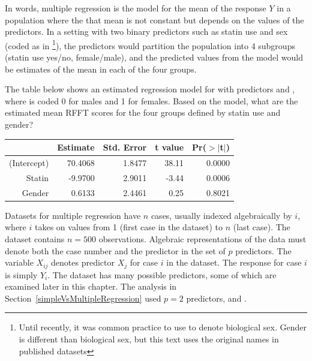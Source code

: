 In words, multiple regression is the model for the mean of the response $Y$ in a population where the that mean is not constant but depends on the values of the predictors.  In a setting with two binary predictors such as statin use and sex (coded as  in \footnote{Until recently, it was common practice to use  to denote biological sex. Gender is different than biological sex, but this text uses the original names in published datasets}), the predictors would partition the population into 4 subgroups (statin use yes/no, female/male), and the predicted values from the model would be estimates of the mean in each of the four groups.

\begin{exercise}
The table below shows an estimated regression model for  with predictors  and , where  is coded 0 for males and 1 for females.  Based on the model, what are the estimated mean RFFT scores for the four groups defined by statin use and gender? 
	\begin{table}[ht]
	\centering
	\begin{tabular}{rrrrr}
	  \hline
	 & Estimate & Std. Error & t value & Pr($>$$|$t$|$) \\ 
	  \hline
	(Intercept) & 70.4068 & 1.8477 & 38.11 & 0.0000 \\ 
	  Statin & -9.9700 & 2.9011 & -3.44 & 0.0006 \\ 
	  Gender & 0.6133 & 2.4461 & 0.25 & 0.8021 \\ 
	   \hline
	\end{tabular}
	\end{table}
\end{exercise}

Datasets for multiple regression have $n$ cases, usually indexed algebraically by $i$, where $i$ takes on values from 1 (first case in the dataset) to $n$ (last case).  The dataset  contains $n = 500$ observations.  Algebraic representations of the data must denote both the case number and the predictor in the set of $p$ predictors. The variable $X_{ij}$ denotes predictor $X_j$ for case $i$ in the dataset.  The response for case $i$ is simply $Y_i$. The dataset  has many possible predictors, some of which are examined later in this chapter.  The analysis in Section~\ref{simpleVsMultipleRegression} used $p=2$ predictors,  and .

